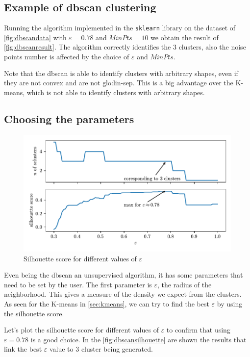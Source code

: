 \subsection{Example of \gls{dbscan} clustering}
Running the algorithm implemented in the \texttt{sklearn} library on the dataset of \autoref{fig:dbscandata} with $\varepsilon = 0.78$ and $MinPts = 10$ we obtain the result of \autoref{fig:dbscanresult}. The algorithm correctly identifies the $3$ clusters, also the noise points number is affected by the choice of $\varepsilon$ and $MinPts$.

Note that the \gls{dbscan} is able to identify clusters with arbitrary shapes, even if they are not convex and are not \gls{glo:lin-sep}. This is a big advantage over the K-means, which is not able to identify clusters with arbitrary shapes.

\subsection{Choosing the parameters}

\begin{figure}
    \centering
    \includegraphics{images/DBSCAN/Figure_4.pdf}
    \caption{Silhouette score for different values of $\varepsilon$}
    \label{fig:dbscansilhouette}
\end{figure}

Even being the \gls{dbscan} an unsupervised algorithm, it has some parameters that need to be set by the user.
The first parameter is $\varepsilon$, the radius of the neighborhood. This gives a measure of the density we expect from the clusters. As seen for the K-means in \autoref{sec:kmeans}, we can try to find the best $\varepsilon$ by using the silhouette score.

Let's plot the silhouette score for different values of $\varepsilon$ to confirm that using $\varepsilon = 0.78$ is a good choice. In the \autoref{fig:dbscansilhouette} are shown the results that link the best $\varepsilon$ value to $3$ cluster being generated.

